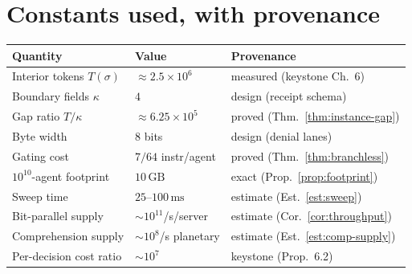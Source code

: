 \documentclass[11pt,oneside]{book}
\theoremstyle{definition}
\theoremstyle{plain}
\theoremstyle{remark}
\newcommand{\CL}{\kappa}                       %
\begin{document}
\section*{Constants used, with provenance}
\begin{tabular}{lll}
\toprule
Quantity & Value & Provenance\\
\midrule
Interior tokens $T(\sigma)$ & $\approx 2.5\times 10^{6}$ & measured (keystone Ch.~6)\\
Boundary fields $\CL$ & $4$ & design (receipt schema)\\
Gap ratio $T/\CL$ & $\approx 6.25\times 10^{5}$ & proved (Thm.~\ref{thm:instance-gap})\\
Byte width & $8$ bits & design (denial lanes)\\
Gating cost & $7/64$ instr/agent & proved (Thm.~\ref{thm:branchless})\\
$10^{10}$-agent footprint & $10\,\mathrm{GB}$ & exact (Prop.~\ref{prop:footprint})\\
Sweep time & $25$--$100\,\mathrm{ms}$ & estimate (Est.~\ref{est:sweep})\\
Bit-parallel supply & $\sim 10^{11}$/s/server & estimate (Cor.~\ref{cor:throughput})\\
Comprehension supply & $\sim 10^{8}$/s planetary & estimate (Est.~\ref{est:comp-supply})\\
Per-decision cost ratio & $\sim 10^{7}$ & keystone (Prop.~6.2)\\
\bottomrule
\end{tabular}
\end{document}

